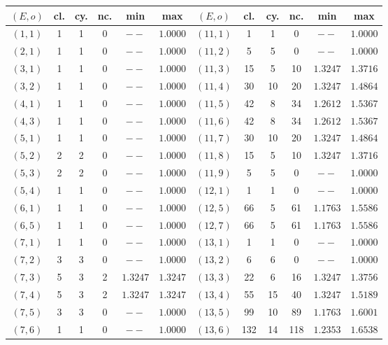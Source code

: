 \begin{table}[h]
\centering\footnotesize
\renewcommand{\arraystretch}{1.1}
\setlength{\tabcolsep}{4.5pt}
\begin{tabular}{@{}cccccc@{\qquad}cccccc@{}}
\toprule
$(E,o)$ & cl. & cy. & nc. & min & max & $(E,o)$ & cl. & cy. & nc. & min & max\\
\midrule
$(1,1)$ & 1 & 1 & 0 & $--$ & $1.0000$ & $(11,1)$ & 1 & 1 & 0 & $--$ & $1.0000$ \\
$(2,1)$ & 1 & 1 & 0 & $--$ & $1.0000$ & $(11,2)$ & 5 & 5 & 0 & $--$ & $1.0000$ \\
$(3,1)$ & 1 & 1 & 0 & $--$ & $1.0000$ & $(11,3)$ & 15 & 5 & 10 & $1.3247$ & $1.3716$ \\
$(3,2)$ & 1 & 1 & 0 & $--$ & $1.0000$ & $(11,4)$ & 30 & 10 & 20 & $1.3247$ & $1.4864$ \\
$(4,1)$ & 1 & 1 & 0 & $--$ & $1.0000$ & $(11,5)$ & 42 & 8 & 34 & $1.2612$ & $1.5367$ \\
$(4,3)$ & 1 & 1 & 0 & $--$ & $1.0000$ & $(11,6)$ & 42 & 8 & 34 & $1.2612$ & $1.5367$ \\
$(5,1)$ & 1 & 1 & 0 & $--$ & $1.0000$ & $(11,7)$ & 30 & 10 & 20 & $1.3247$ & $1.4864$ \\
$(5,2)$ & 2 & 2 & 0 & $--$ & $1.0000$ & $(11,8)$ & 15 & 5 & 10 & $1.3247$ & $1.3716$ \\
$(5,3)$ & 2 & 2 & 0 & $--$ & $1.0000$ & $(11,9)$ & 5 & 5 & 0 & $--$ & $1.0000$ \\
$(5,4)$ & 1 & 1 & 0 & $--$ & $1.0000$ & $(12,1)$ & 1 & 1 & 0 & $--$ & $1.0000$ \\
$(6,1)$ & 1 & 1 & 0 & $--$ & $1.0000$ & $(12,5)$ & 66 & 5 & 61 & $1.1763$ & $1.5586$ \\
$(6,5)$ & 1 & 1 & 0 & $--$ & $1.0000$ & $(12,7)$ & 66 & 5 & 61 & $1.1763$ & $1.5586$ \\
$(7,1)$ & 1 & 1 & 0 & $--$ & $1.0000$ & $(13,1)$ & 1 & 1 & 0 & $--$ & $1.0000$ \\
$(7,2)$ & 3 & 3 & 0 & $--$ & $1.0000$ & $(13,2)$ & 6 & 6 & 0 & $--$ & $1.0000$ \\
$(7,3)$ & 5 & 3 & 2 & $1.3247$ & $1.3247$ & $(13,3)$ & 22 & 6 & 16 & $1.3247$ & $1.3756$ \\
$(7,4)$ & 5 & 3 & 2 & $1.3247$ & $1.3247$ & $(13,4)$ & 55 & 15 & 40 & $1.3247$ & $1.5189$ \\
$(7,5)$ & 3 & 3 & 0 & $--$ & $1.0000$ & $(13,5)$ & 99 & 10 & 89 & $1.1763$ & $1.6001$ \\
$(7,6)$ & 1 & 1 & 0 & $--$ & $1.0000$ & $(13,6)$ & 132 & 14 & 118 & $1.2353$ & $1.6538$ \\

\end{tabular}
\end{table}
